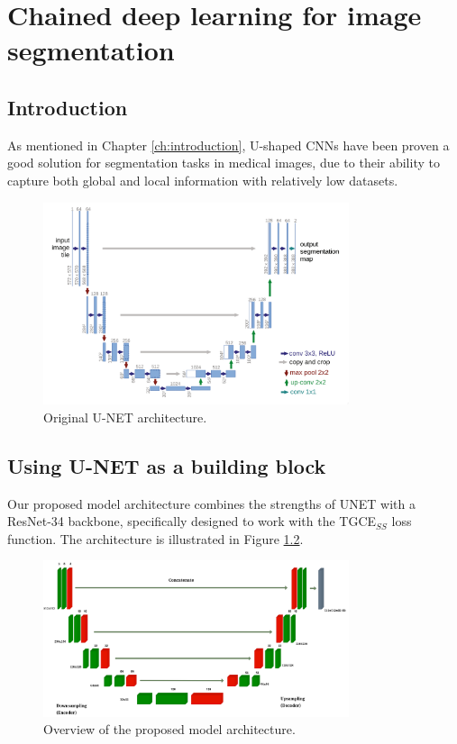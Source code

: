 \chapter{Chained deep learning for image
segmentation}\label{ch:chained_deep_learning_seg}

\section{Introduction}

As mentioned in Chapter \ref{ch:introduction}, U-shaped \glspl{CNN} have been
proven a good solution for segmentation tasks in medical images, due to their
ability to capture both global and local information with relatively low
datasets.

\begin{figure}[h]
  \centering
  \includegraphics[width=0.8\textwidth]{Cap5/Figures/unet_architecture.png}
  \caption{Original U-NET architecture.}
  \label{fig:unet_architecture}
\end{figure}

\section{Using U-NET as a building block}

Our proposed model architecture combines the strengths of UNET with a
ResNet-34 backbone, specifically designed to work with the
TGCE$_{SS}$ loss function. The architecture is illustrated in Figure
\ref{fig:model_architecture}.

\begin{figure}[h]
  \centering
  \includegraphics[width=0.8\textwidth]{Cap5/Figures/cnn_arch_overview.png}
  \caption{Overview of the proposed model architecture.}
  \label{fig:model_architecture}
\end{figure}

